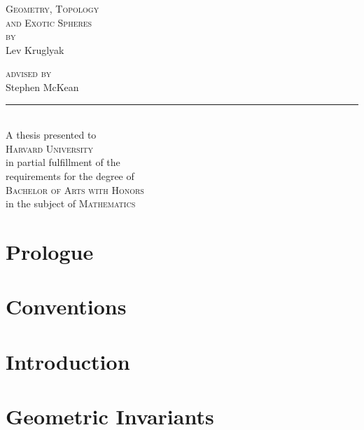 \documentclass{lkx_thesis}
\begin{document}
\begin{titlepage}
	\begin{center}
		\vfill
		{\HUGE\scshape Geometry, Topology\\ and Exotic Spheres}\\[4em]

		{\Large \scshape by}\\[2em]
		{\huge Lev Kruglyak}\\[3in]

		{
		\Large
		{\scshape advised by\\[1em]}
		{Stephen McKean}\\[1em]
    \noindent\rule{1in}{0.6pt}\\[1em]
		A thesis presented to \\[1em]
		\textsc{Harvard University}\\[1em]
		in partial fulfillment of the \\
		requirements for the degree of\\[1em]

		\textsc{Bachelor of Arts with Honors}\\
		in the subject of \textsc{Mathematics}
		}
		\vfill
	\end{center}
\end{titlepage}

\lkxtoc

\chapter*{Prologue}\label{chap:prologue}


\chapter*{Conventions}\label{chap:conventions}


\chapter{Introduction}\label{chap:introduction}




\chapter{Geometric Invariants}\label{chap:detection}

\end{document}
